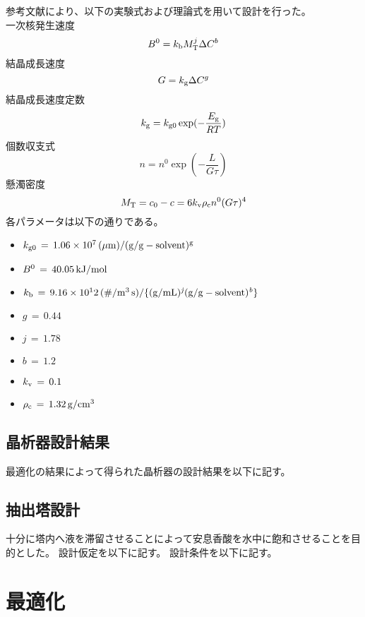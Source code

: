 \documentclass[a4j]{jsreport}
\begin{document}
参考文献\cite{晶析}により、以下の実験式および理論式を用いて設計を行った。\\
一次核発生速度
\begin{equation}
    B^0 = k_{{\rm b}}M_{{\rm T}}^j \Delta C^b
\end{equation}
結晶成長速度
\begin{equation}
    G = k_{{\rm g}}\Delta C^g
\end{equation}
結晶成長速度定数
\begin{equation}
    k_{{\rm g}} = k_{{\rm g0}} \exp(-\frac{E_{{\rm g}}}{RT})
\end{equation}
個数収支式
\begin{equation}
    n=n^0 \exp(-\frac{L}{G\tau})
\end{equation}
懸濁密度
\begin{equation}
    M_{{\rm T}} = c_0-c = 6k_{{\rm v}}\rho_{{\rm c}}n^0(G\tau)^4
\end{equation}
各パラメータは以下の通りである。
\begin{itemize}
    \item[] $k_{{\rm g0}}\,=\,1.06\times10^7\,{\rm (\mu m)/(g/g-solvent)^g}$
    \item[] $B^{{\rm 0}}\,=\,40.05\,{\rm kJ/mol}$
    \item[] $k_{{\rm b}}\,=\,9.16\times10^12\,{\rm (\#/ m^3\,s)/\{(g/mL)^{{\it j}}(g/g-solvent)^{{\it b}}\}}$
    \item[] $g\,=\,0.44\,$
    \item[] $j\,=\,1.78\,$
    \item[] $b\,=\,1.2\,$
    \item[] $k_{{\rm v}}\,=\,0.1\,$
    \item[] $\rho_{{\rm c}}\,=\,1.32\,{\rm g/cm^3}$
\end{itemize}

\section{晶析器設計結果}
最適化の結果によって得られた晶析器の設計結果を以下に記す。

\section{抽出塔設計}
十分に塔内へ液を滞留させることによって安息香酸を水中に飽和させることを目的とした。
設計仮定を以下に記す。
設計条件を以下に記す。

\newpage
\chapter{最適化}
\end{document}
